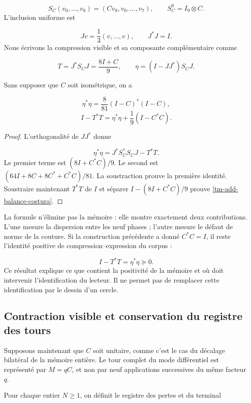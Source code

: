 \[
S_C(v_0,\ldots,v_8)=(Cv_8,v_0,\ldots,v_7),
\qquad S_C^9=I_9\otimes C.
\]
L'inclusion uniforme est

\[
Jv=\frac13(v,\ldots,v),\qquad J^*J=I.
\]
Nous écrivons la compression visible et sa composante complémentaire comme

\[
T=J^*S_CJ=\frac{8I+C}{9},\qquad
\eta=(I-JJ^*)S_CJ.
\]
\begin{proposition}
\label{tm-add-proposicion-costura-1}
Sans supposer que \(C\) soit isométrique, on a

\[
\eta^*\eta=\frac8{81}(I-C)^*(I-C),
\]
\begin{equation}
\boxed{I-T^*T=\eta^*\eta+\frac19(I-C^*C).}
\label{tm-add-balance-costura}
\end{equation}
\end{proposition}

\begin{proof}
L'orthogonalité de \(JJ^*\) donne

\[
\eta^*\eta=J^*S_C^*S_CJ-T^*T.
\]
Le premier terme est \((8I+C^*C)/9\). Le second est \((64I+8C+8C^*+C^*C)/81\). La soustraction prouve la première identité. Soustraire maintenant \(T^*T\) de \(I\) et séparer \(I-(8I+C^*C)/9\) prouve \eqref{tm-add-balance-costura}.
\end{proof}

La formule n'élimine pas la mémoire : elle montre exactement deux contributions. L'une mesure la dispersion entre les neuf phases ; l'autre mesure le défaut de norme de la couture. Si la construction précédente a donné \(C^*C=I\), il reste l'identité positive de compression–expression du corpus :

\[
I-T^*T=\eta^*\eta\succeq0.
\]
Ce résultat explique ce que contient la positivité de la mémoire et où doit intervenir l'identification du lecteur. Il ne permet pas de remplacer cette identification par le dessin d'un cercle.


\subsection{Contraction visible et conservation du registre des tours}
\label{tm-add-c3}
Supposons maintenant que \(C\) soit unitaire, comme c'est le cas du décalage bilatéral de la mémoire entière. Le tour complet du mode différentiel est représenté par \(M=qC\), et non par neuf applications successives du même facteur \(q\).

Pour chaque entier \(N\geq1\), on définit le registre des pertes et du terminal

